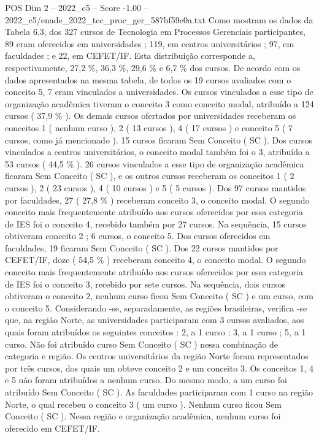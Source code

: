 \begin{textsample}{POS Dim 2 – 2022\_c5 – Score -1.00 – 2022\_c5/enade\_2022\_tec\_proc\_ger\_587bf59e0a.txt}
Como mostram os dados da Tabela 6.3, dos 327 cursos de Tecnologia em Processos Gerenciais participantes, 89 eram oferecidos em universidades ; 119, em centros universitários ; 97, em faculdades ; e 22, em CEFET/IF.
Esta distribuição corresponde a, respectivamente, 27,2 \%, 36,3 \%, 29,6 \% e 6,7 \% dos cursos.
De acordo com os dados apresentados na mesma tabela, de todos os 19 cursos avaliados com o conceito 5, 7 eram vinculados a universidades.
Os cursos vinculados a esse tipo de organização acadêmica tiveram o conceito 3 como conceito modal, atribuído a 124 cursos ( 37,9 \% ).
Os demais cursos ofertados por universidades receberam os conceitos 1 ( nenhum curso ), 2 ( 13 cursos ), 4 ( 17 cursos ) e conceito 5 ( 7 cursos, como já mencionado ). 15 cursos ficaram Sem Conceito ( SC ).
Dos cursos vinculados a centros universitários, o conceito modal também foi o 3, atribuído a 53 cursos ( 44,5 \% ). 26 cursos vinculados a esse tipo de organização acadêmica ficaram Sem Conceito ( SC ), e os outros cursos receberam os conceitos 1 ( 2 cursos ), 2 ( 23 cursos ), 4 ( 10 cursos ) e 5 ( 5 cursos ).
Dos 97 cursos mantidos por faculdades, 27 ( 27,8 \% ) receberam conceito 3, o conceito modal.
O segundo conceito mais frequentemente atribuído aos cursos oferecidos por essa categoria de IES foi o conceito 4, recebido também por 27 cursos.
Na sequência, 15 cursos obtiveram conceito 2 ; 6 cursos, o conceito 5.
Dos cursos oferecidos em faculdades, 19 ficaram Sem Conceito ( SC ).
Dos 22 cursos mantidos por CEFET/IF, doze ( 54,5 \% ) receberam conceito 4, o conceito modal.
O segundo conceito mais frequentemente atribuído aos cursos oferecidos por essa categoria de IES foi o conceito 3, recebido por sete cursos.
Na sequência, dois cursos obtiveram o conceito 2, nenhum curso ficou Sem Conceito ( SC ) e um curso, com o conceito 5.
Considerando -se, separadamente, as regiões brasileiras, verifica -se que, na região Norte, as universidades participaram com 3 cursos avaliados, aos quais foram atribuídos os seguintes conceitos : 2, a 1 curso ; 3, a 1 curso ; 5, a 1 curso.
Não foi atribuído curso Sem Conceito ( SC ) nessa combinação de categoria e região.
Os centros universitários da região Norte foram representados por três cursos, dos quais um obteve conceito 2 e um conceito 3.
Os conceitos 1, 4 e 5 não foram atribuídos a nenhum curso.
Do mesmo modo, a um curso foi atribuído Sem Conceito ( SC ).
As faculdades participaram com 1 curso na região Norte, o qual recebeu o conceito 3 ( um curso ).
Nenhum curso ficou Sem Conceito ( SC ).
Nessa região e organização acadêmica, nenhum curso foi oferecido em CEFET/IF.

\end{textsample}
